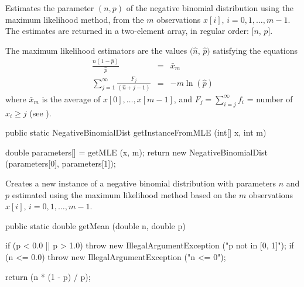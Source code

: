 \begin{tabb}
   Estimates the parameter $(n, p)$ of the negative binomial distribution
   using the maximum likelihood method, from the $m$ observations
   $x[i]$, $i = 0, 1, \ldots, m-1$. The estimates are returned in a two-element
    array, in regular order: [$n$, $p$].
   \begin{detailed}
   The maximum likelihood estimators are the values $(\hat{n}$, $\hat{p})$
   satisfying the equations
   \begin{eqnarray*}
      \frac{\hat{n}(1 - \hat{p})}{\hat{p}} & = & \bar{x}_m\\
     \sum_{j=1}^{\infty} \frac{F_j}{(\hat{n} + j - 1)}  & = & -m\ln (\hat{p})
   \end{eqnarray*}
   where  $\bar x_m$ is the average of $x[0],\dots,x[m-1]$, and
   $F_j = \sum_{i=j}^{\infty} f_i$ = number of $x_i \ge j$ (see
   \cite[page 132]{tJOH69a}).
   \end{detailed}
\end{tabb}
\begin{htmlonly}
\end{htmlonly}
\begin{code}

   public static NegativeBinomialDist getInstanceFromMLE (int[] x, int m)\begin{hide} {
      double parameters[] = getMLE (x, m);
      return new NegativeBinomialDist (parameters[0], parameters[1]);
   }\end{hide}
\end{code}
\begin{tabb}
   Creates a new instance of a negative binomial distribution with
   parameters $n$ and $p$ estimated using the maximum likelihood method
   based on the $m$ observations $x[i]$,   $i = 0, 1, \ldots, m-1$.
\end{tabb}
\begin{htmlonly}
\end{htmlonly}
\begin{code}

   public static double getMean (double n, double p)\begin{hide} {
      if (p < 0.0 || p > 1.0)
         throw new IllegalArgumentException ("p not in [0, 1]");
      if (n <= 0.0)
         throw new IllegalArgumentException ("n <= 0");

      return (n * (1 - p) / p);
   }\end{hide}
\end{code}
